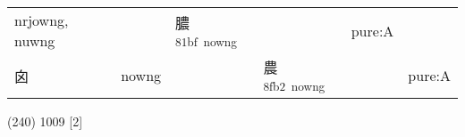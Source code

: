 \documentclass[14pt,a4paper]{scrartcl}
\begin{document}
\begin{longtable}[c]{@{}llllll@{}}
\begin{minipage}[t]{0.14\columnwidth}\raggedright\strut
nrjowng, nuwng
\strut\end{minipage} &
\begin{minipage}[t]{0.14\columnwidth}\raggedright\strut
\strut\end{minipage} &
\begin{minipage}[t]{0.14\columnwidth}\raggedright\strut
膿\textsuperscript{81bf~nowng}
\strut\end{minipage} &
\begin{minipage}[t]{0.14\columnwidth}\raggedright\strut
\strut\end{minipage} &
\begin{minipage}[t]{0.14\columnwidth}\raggedright\strut
pure:A
\strut\end{minipage}\tabularnewline
\begin{minipage}[t]{0.14\columnwidth}\raggedright\strut
囟
\strut\end{minipage} &
\begin{minipage}[t]{0.14\columnwidth}\raggedright\strut
nowng
\strut\end{minipage} &
\begin{minipage}[t]{0.14\columnwidth}\raggedright\strut
\strut\end{minipage} &
\begin{minipage}[t]{0.14\columnwidth}\raggedright\strut
農\textsuperscript{8fb2~nowng}
\strut\end{minipage} &
\begin{minipage}[t]{0.14\columnwidth}\raggedright\strut
\strut\end{minipage} &
\begin{minipage}[t]{0.14\columnwidth}\raggedright\strut
pure:A
\strut\end{minipage}\tabularnewline
\bottomrule
\end{longtable}

(240) 1009 {[}2{]}
\end{document}
